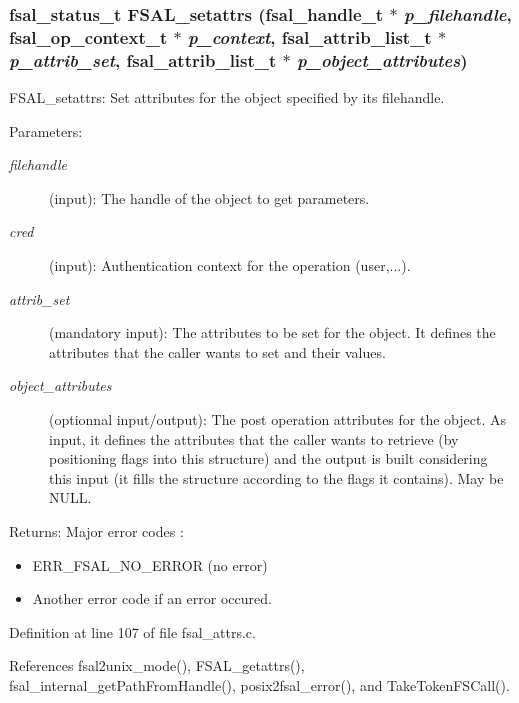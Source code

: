\subsubsection{\setlength{\rightskip}{0pt plus 5cm}fsal\_\-status\_\-t FSAL\_\-setattrs (fsal\_\-handle\_\-t $\ast$ {\em p\_\-filehandle}, fsal\_\-op\_\-context\_\-t $\ast$ {\em p\_\-context}, fsal\_\-attrib\_\-list\_\-t $\ast$ {\em p\_\-attrib\_\-set}, fsal\_\-attrib\_\-list\_\-t $\ast$ {\em p\_\-object\_\-attributes})}\label{fsal__attrs_8c_a1}


FSAL\_\-setattrs: Set attributes for the object specified by its filehandle.

\begin{Desc}
\item[Parameters:]
\begin{description}
\item[{\em filehandle}](input): The handle of the object to get parameters. \item[{\em cred}](input): Authentication context for the operation (user,...). \item[{\em attrib\_\-set}](mandatory input): The attributes to be set for the object. It defines the attributes that the caller wants to set and their values. \item[{\em object\_\-attributes}](optionnal input/output): The post operation attributes for the object. As input, it defines the attributes that the caller wants to retrieve (by positioning flags into this structure) and the output is built considering this input (it fills the structure according to the flags it contains). May be NULL.\end{description}
\end{Desc}
\begin{Desc}
\item[Returns:]Major error codes :\begin{itemize}
\item ERR\_\-FSAL\_\-NO\_\-ERROR (no error)\item Another error code if an error occured. \end{itemize}
\end{Desc}


Definition at line 107 of file fsal\_\-attrs.c.

References fsal2unix\_\-mode(), FSAL\_\-getattrs(), fsal\_\-internal\_\-get\-Path\-From\-Handle(), posix2fsal\_\-error(), and Take\-Token\-FSCall().